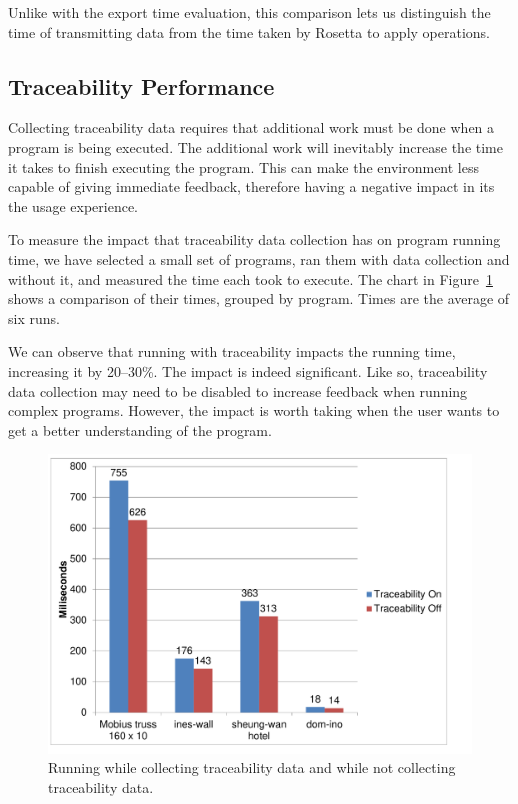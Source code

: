 Unlike with the export time evaluation, this comparison lets us distinguish the time of transmitting data from the time taken by Rosetta to apply operations.


\subsection{Traceability Performance}
Collecting traceability data requires that additional work must be done when a program is being executed.
The additional work will inevitably increase the time it takes to finish executing the program.
This can make the environment less capable of giving immediate feedback, therefore having a negative impact in its the usage experience.

To measure the impact that traceability data collection has on program running time, we have selected a small set of programs, ran them with data collection and without it, and measured the time each took to execute.
The chart in Figure~\ref{fig:traceability:timing} shows a comparison of their times, grouped by program.
Times are the average of six runs.

We can observe that running with traceability impacts the running time, increasing it by 20--30\%.
The impact is indeed significant.
Like so, traceability data collection may need to be disabled to increase feedback when running complex programs.
However, the impact is worth taking when the user wants to get a better understanding of the program.

\begin{figure}
  \centering
  \includegraphics[width=12cm]{./images/traceability_timing}
  \caption{Running while collecting traceability data and while not collecting traceability data.}
  \label{fig:traceability:timing}
\end{figure}







